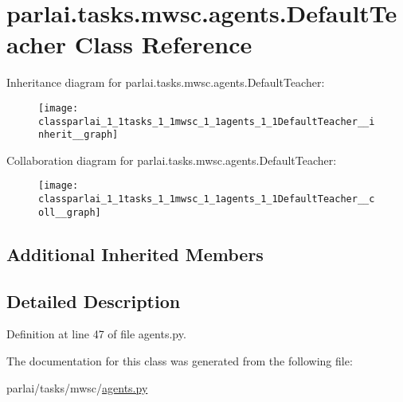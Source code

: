 \hypertarget{classparlai_1_1tasks_1_1mwsc_1_1agents_1_1DefaultTeacher}{}\section{parlai.\+tasks.\+mwsc.\+agents.\+Default\+Teacher Class Reference}
\label{classparlai_1_1tasks_1_1mwsc_1_1agents_1_1DefaultTeacher}


Inheritance diagram for parlai.\+tasks.\+mwsc.\+agents.\+Default\+Teacher\+:
\nopagebreak
\begin{figure}[H]
\begin{center}
\leavevmode
\texttt{[image: classparlai\_1\_1tasks\_1\_1mwsc\_1\_1agents\_1\_1DefaultTeacher\_\_inherit\_\_graph]}
\end{center}
\end{figure}


Collaboration diagram for parlai.\+tasks.\+mwsc.\+agents.\+Default\+Teacher\+:
\nopagebreak
\begin{figure}[H]
\begin{center}
\leavevmode
\texttt{[image: classparlai\_1\_1tasks\_1\_1mwsc\_1\_1agents\_1\_1DefaultTeacher\_\_coll\_\_graph]}
\end{center}
\end{figure}
\subsection*{Additional Inherited Members}


\subsection{Detailed Description}


Definition at line 47 of file agents.\+py.



The documentation for this class was generated from the following file\+:\begin{DoxyCompactItemize}
\item 
parlai/tasks/mwsc/\hyperlink{parlai_2tasks_2mwsc_2agents_8py}{agents.\+py}\end{DoxyCompactItemize}
